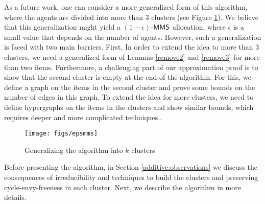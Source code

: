 As a future work, one can consider a more generalized form of this algorithm, where the agents are divided into more than $3$ clusters (see Figure \ref{epsmms}). We believe that this generalization might yield a $(1-\epsilon)$-$\mathsf{MMS}$ allocation, where $\epsilon$ is a small value that depends on the number of agents. However, such a generalization is faced with two main barriers. First, In order to extend the idea to more than 3 clusters, we need a generalized form of Lemmas \ref{remove2} and \ref{remove3} for more than two items. Furthermore, a challenging part of our approximation proof is to show that the second cluster is empty at the end of the algorithm. For this, we define a graph on the items in the second cluster and prove some bounds on the number of edges in this graph. To extend the idea for more clusters, we need to define hypergraphs on the items in the clusters and show similar bounds, which requires deeper and more complicated techniques..   
\begin{figure}[h]
\centerline{
\texttt{[image: figs/epsmms]}
}
\caption{Generalizing the algorithm into $k$ clusters}
\label{epsmms}
\end{figure}  

Before presenting the algorithm, in Section \ref{additive:observations} we discuss the consequences of irreducibility and  techniques to build the clusters and preserving cycle-envy-freeness in each cluster. Next, we describe the algorithm in more details. 
